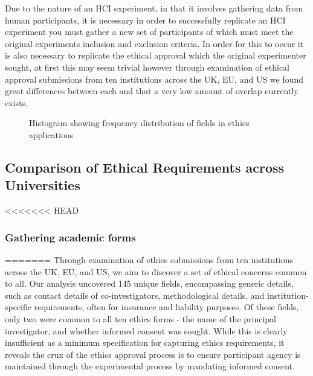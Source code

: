Due to the nature of an HCI experiment, in that it involves gathering data from human participants, it is necessary in order to successfully replicate an HCI experiment you must gather a new set of participants of which must meet the original experiments inclusion and exclusion criteria. In order for this to occur it is also necessary to replicate the ethical approval which the original experimenter sought, at first this may seem trivial however through examination of ethical approval submissions from ten institutions across the UK, EU, and US we found great differences between each and that a very low amount of overlap currently exists.

\begin{figure}
    \centerline{}
    \caption{Histogram showing frequency distribution of fields in ethics applications}
\end{figure}

\subsection{Comparison of Ethical Requirements across Universities}

<<<<<<< HEAD
\subsubsection{Gathering academic forms}
=======
Through examination of ethics submissions from ten institutions across the UK, EU, and US,
we aim to discover a set of ethical concerns common to all. 
Our analysis uncovered 145 unique fields, 
encompassing generic details, such as contact details of co-investigators, methodological
details, and institution-specific requirements, often for insurance and liability purposes.
Of these fields, only two were common to all ten ethics forms - the name of the principal
investigator, and whether informed consent was sought. While this is clearly insufficient
as a minimum specification for capturing ethics requirements, it reveals the crux of the 
ethics approval process is to ensure participant agency is maintained through the experimental process by mandating informed consent.


